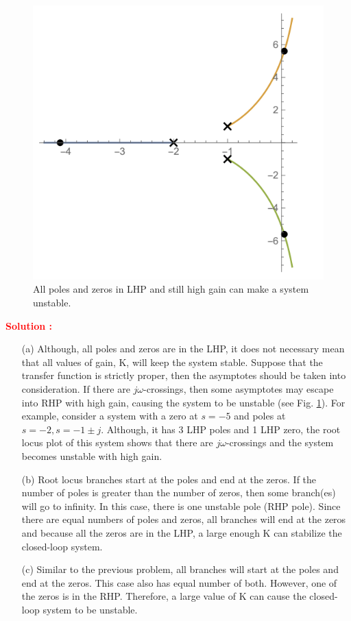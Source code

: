 \documentclass[12pt]{article}
\begin{document}
\begin{figure}[h!]
    \centering
    \includegraphics[scale=0.5]{figs/7.2.png}
    \caption{All poles and zeros in LHP and still high gain can make a system unstable.}
    \label{fig:prb_6}
\end{figure}
\textbf{\textcolor{red}{Solution :}} 
\begin{itemize}
    \item [(a)] Although, all poles and zeros are in the LHP, it does not necessary mean that all values of gain, K, will keep the system stable. Suppose that the transfer function is strictly proper, then the asymptotes should be taken into consideration. If there are $j \omega$-crossings, then some asymptotes may escape into RHP with high gain, causing the system to be unstable (see Fig. \ref{fig:prb_6}). For example, consider a system with a zero at $s =-5$ and poles at $s =-2, s =-1 \pm j$. Although, it has 3 LHP poles and 1 LHP zero, the root locus plot of this system shows that there are $j \omega$-crossings and the system becomes unstable with high gain.
    \item[(b)]  Root locus branches start at the poles and end at the zeros. If the number of poles is greater than the number of zeros, then some branch(es) will go to infinity. In this case, there is one unstable pole (RHP pole). Since there are equal numbers of poles and zeros, all branches will end at the zeros and because all the zeros are in the LHP, a large enough K can stabilize the closed-loop system.
    \item[(c)] Similar to the previous problem, all branches will start at the poles and end at the zeros. This case also has equal number of both. However, one of the zeros is in the RHP. Therefore, a large value of K can cause the closed-loop system to be unstable. 
\end{itemize}
\clearpage
\end{document}
